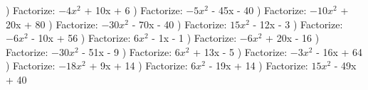 \documentclass{article}%
\begin{document}
) Factorize: $-4x^2$ + 10x + 6%
\newline%
\newline%
) Factorize: $-5x^2$ - 45x - 40%
\newline%
\newline%
) Factorize: $-10x^2$ + 20x + 80%
\newline%
\newline%
) Factorize: $-30x^2$ - 70x - 40%
\newline%
\newline%
) Factorize: $15x^2$ - 12x - 3%
\newline%
\newline%
) Factorize: $-6x^2$ - 10x + 56%
\newline%
\newline%
) Factorize: $6x^2$ - 1x - 1%
\newline%
\newline%
) Factorize: $-6x^2$ + 20x - 16%
\newline%
\newline%
) Factorize: $-30x^2$ - 51x - 9%
\newline%
\newline%
) Factorize: $6x^2$ + 13x - 5%
\newline%
\newline%
) Factorize: $-3x^2$ - 16x + 64%
\newline%
\newline%
) Factorize: $-18x^2$ + 9x + 14%
\newline%
\newline%
) Factorize: $6x^2$ - 19x + 14%
\newline%
\newline%
) Factorize: $15x^2$ - 49x + 40%
\newline%
\newline%
\newline%
\end{document}
